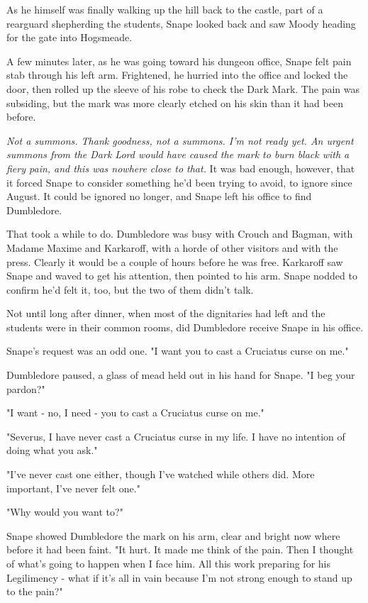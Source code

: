 \documentclass[a4paper,11pt]{article}
\begin{document}
As he himself was finally walking up the hill back to the castle, part of a rearguard shepherding the students, Snape looked back and saw Moody heading for the gate into Hogsmeade.

A few minutes later, as he was going toward his dungeon office, Snape felt pain stab through his left arm. Frightened, he hurried into the office and locked the door, then rolled up the sleeve of his robe to check the Dark Mark. The pain was subsiding, but the mark was more clearly etched on his skin than it had been before.

\emph{Not a summons. Thank goodness, not a summons. I'm not ready yet. An urgent summons from the Dark Lord would have caused the mark to burn black with a fiery pain, and this was nowhere close to that.} It was bad enough, however, that it forced Snape to consider something he'd been trying to avoid, to ignore since August. It could be ignored no longer, and Snape left his office to find Dumbledore.

That took a while to do. Dumbledore was busy with Crouch and Bagman, with Madame Maxime and Karkaroff, with a horde of other visitors and with the press. Clearly it would be a couple of hours before he was free. Karkaroff saw Snape and waved to get his attention, then pointed to his arm. Snape nodded to confirm he'd felt it, too, but the two of them didn't talk.

Not until long after dinner, when most of the dignitaries had left and the students were in their common rooms, did Dumbledore receive Snape in his office.

Snape's request was an odd one. "I want you to cast a Cruciatus curse on me."

Dumbledore paused, a glass of mead held out in his hand for Snape. "I beg your pardon?"

"I want - no, I need - you to cast a Cruciatus curse on me."

"Severus, I have never cast a Cruciatus curse in my life. I have no intention of doing what you ask."

"I've never cast one either, though I've watched while others did. More important, I've never felt one."

"Why would you want to?"

Snape showed Dumbledore the mark on his arm, clear and bright now where before it had been faint. "It hurt. It made me think of the pain. Then I thought of what's going to happen when I face him. All this work preparing for his Legilimency - what if it's all in vain because I'm not strong enough to stand up to the pain?"
\end{document}
